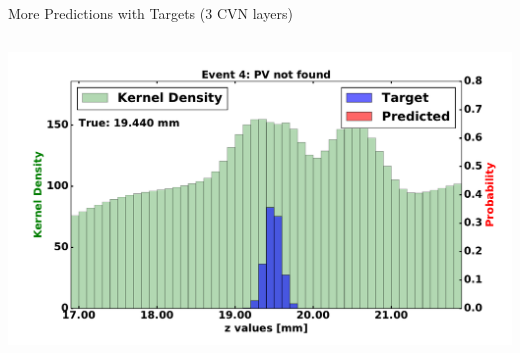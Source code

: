 \begin{frame}{More Predictions with Targets (3 CVN layers)}
\begin{columns}[c]
\begin{center}
           \includegraphics[width=1\textwidth, height=0.45\textwidth, trim=18 0 18 0]{images/120000_3layer_23.pdf}
       \end{center}
  \end{columns}
\end{frame}

